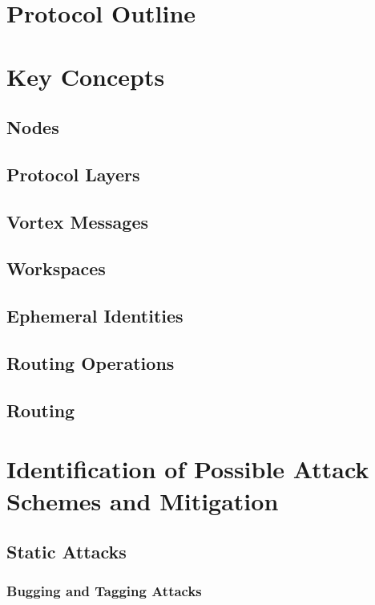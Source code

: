 \chapter{Protocol Outline}
\chapter{Key Concepts}
\section{Nodes}
\section{Protocol Layers}
\section{Vortex Messages}
\section{Workspaces}
\section{Ephemeral Identities}
\section{Routing Operations}
\section{Routing}



\chapter{Identification of Possible Attack Schemes and Mitigation}
\section{Static Attacks}
\subsection{Bugging and Tagging Attacks}
